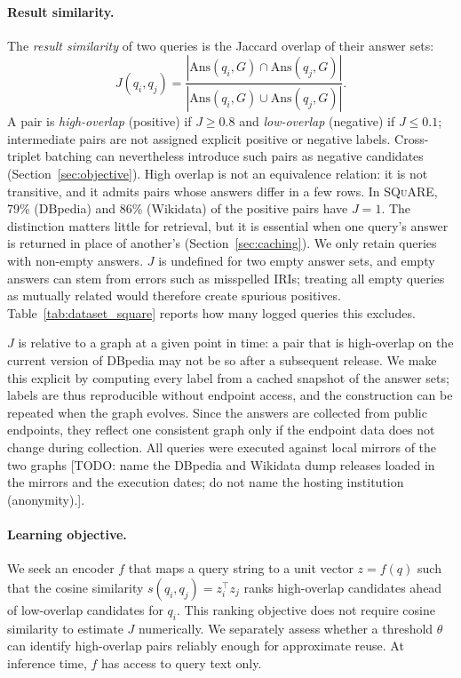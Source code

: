 \documentclass[runningheads]{llncs}
\newcommand{\squareds}{\textsc{SQuARE}}
\newcommand{\Ans}{\mathrm{Ans}}
\newcommand{\hp}[1]{{\color{red!75!black}#1}}
\begin{document}
\paragraph{Result similarity.}
The \emph{result similarity} of two queries is the Jaccard overlap of their
answer sets:
\begin{equation}
J(q_i,q_j) = \frac{|\Ans(q_i,G) \cap \Ans(q_j,G)|}{|\Ans(q_i,G) \cup \Ans(q_j,G)|}.
\label{eq:jaccard}
\end{equation}
A pair is \emph{high-overlap} (positive) if $J \geq 0.8$ and
\emph{low-overlap} (negative) if $J \leq 0.1$; intermediate pairs are not
assigned explicit positive or negative labels. Cross-triplet batching can
nevertheless introduce such pairs as negative candidates
(Section~\ref{sec:objective}). High overlap is not an equivalence relation: it is not
transitive, and it admits pairs whose answers differ in a few rows. In \squareds{},
79\% (DBpedia) and 86\% (Wikidata) of the positive pairs have $J = 1$. The distinction matters
little for retrieval, but it is essential when one query's answer is returned
in place of another's (Section~\ref{sec:caching}).
We only retain queries with non-empty answers. $J$ is undefined for two empty
answer sets, and empty answers can stem from errors such as misspelled IRIs;
treating all empty queries as mutually related would therefore create
spurious positives. Table~\ref{tab:dataset_square} reports how many logged
queries this excludes.

$J$ is relative to a graph at a given point in time: a pair that is
high-overlap on the current version of DBpedia may not be so after a
subsequent release. We make this explicit by computing every label from a
cached snapshot of the answer sets; labels are thus reproducible without
endpoint access, and the construction can be repeated when the graph evolves.
Since the answers are collected from public endpoints, they reflect one
consistent graph only if the endpoint data does not change during collection.
All queries were executed against local mirrors of the two graphs
\hp{[TODO: name the DBpedia and Wikidata dump releases loaded in the mirrors
and the execution dates; do not name the hosting institution (anonymity).]}.

\paragraph{Learning objective.}
We seek an encoder $f$ that maps a query string to a unit vector $z = f(q)$
such that the cosine similarity $s(q_i,q_j) = z_i^{\top} z_j$ ranks high-overlap
candidates ahead of low-overlap candidates for $q_i$. This ranking objective
does not require cosine similarity to estimate $J$ numerically. We separately
assess whether a threshold $\theta$ can identify high-overlap pairs reliably
enough for approximate reuse. At inference time, $f$ has access to query
text only.
\end{document}

